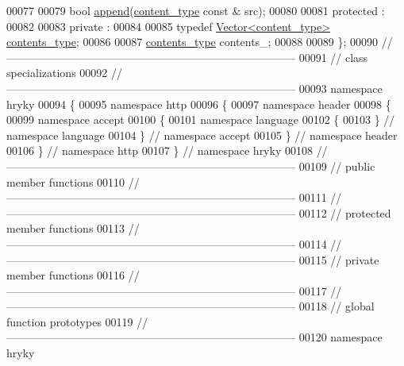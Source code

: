 \begin{DoxyCode}
00077 
00079     \textcolor{keywordtype}{bool} \hyperlink{classhryky_1_1http_1_1header_1_1accept_1_1language_1_1_entity_a8f4d30c10851e14205468389791fe55d}{append}(\hyperlink{classhryky_1_1http_1_1header_1_1accept_1_1language_1_1content_1_1_entity}{content_type} \textcolor{keyword}{const} & src);
00080 
00081 \textcolor{keyword}{protected} :
00082 
00083 \textcolor{keyword}{private} :
00084 
00085     \textcolor{keyword}{typedef} \hyperlink{classhryky_1_1_vector}{Vector<content_type>} \hyperlink{classhryky_1_1_vector}{contents_type};
00086 
00087     \hyperlink{classhryky_1_1_vector}{contents_type} contents\_;
00088 
00089 \};
00090 \textcolor{comment}{//
      ------------------------------------------------------------------------------}
00091 \textcolor{comment}{// class specializations}
00092 \textcolor{comment}{//
      ------------------------------------------------------------------------------}
00093 \textcolor{keyword}{namespace }hryky
00094 \{
00095 \textcolor{keyword}{namespace }http
00096 \{
00097 \textcolor{keyword}{namespace }header
00098 \{
00099 \textcolor{keyword}{namespace }accept
00100 \{
00101 \textcolor{keyword}{namespace }language
00102 \{
00103 \} \textcolor{comment}{// namespace language}
00104 \} \textcolor{comment}{// namespace accept}
00105 \} \textcolor{comment}{// namespace header}
00106 \} \textcolor{comment}{// namespace http}
00107 \} \textcolor{comment}{// namespace hryky}
00108 \textcolor{comment}{//
      ------------------------------------------------------------------------------}
00109 \textcolor{comment}{// public member functions}
00110 \textcolor{comment}{//
      ------------------------------------------------------------------------------}
00111 \textcolor{comment}{//
      ------------------------------------------------------------------------------}
00112 \textcolor{comment}{// protected member functions}
00113 \textcolor{comment}{//
      ------------------------------------------------------------------------------}
00114 \textcolor{comment}{//
      ------------------------------------------------------------------------------}
00115 \textcolor{comment}{// private member functions}
00116 \textcolor{comment}{//
      ------------------------------------------------------------------------------}
00117 \textcolor{comment}{//
      ------------------------------------------------------------------------------}
00118 \textcolor{comment}{// global function prototypes}
00119 \textcolor{comment}{//
      ------------------------------------------------------------------------------}
00120 \textcolor{keyword}{namespace }hryky

\end{DoxyCode}

